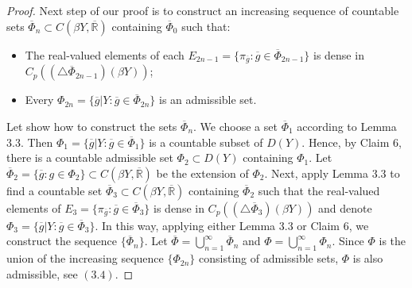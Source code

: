 \documentclass[12pt]{amsart}
\begin{document}
\begin{proof}
Next step of our proof is to construct an increasing sequence of countable sets $\overline\Phi_n\subset C(\beta Y,\overline{\mathbb R})$ containing $\overline\Phi_0$ such that:
\begin{itemize}
\item The real-valued elements of each $E_{2n-1}=\{\pi_{\overline g}: \overline g\in\overline\Phi_{2n-1}\}$ is dense in
$C_p((\triangle\overline\Phi_{2n-1})(\beta Y))$;
\item Every $\Phi_{2n}=\{\overline g|Y:\overline g\in\overline\Phi_{2n}\}$ is an admissible set.
\end{itemize}
Let show how to construct the sets $\overline\Phi_{n}$. We choose a set $\overline\Phi_{1}$ according to Lemma 3.3. Then 
$\Phi_{1}=\{\overline g|Y:\overline g\in\overline\Phi_{1}\}$ is a countable subset of $D(Y)$. Hence, by Claim 6, there is a countable admissible set
$\Phi_2\subset D(Y)$ containing $\Phi_{1}$. Let $\overline\Phi_2=\{\overline g:g\in\Phi_2\}\subset C(\beta Y,\overline{\mathbb R})$ be the extension of $\Phi_2$. Next, apply Lemma 3.3 to find a countable set $\overline\Phi_3\subset C(\beta Y,\overline{\mathbb R})$ containing $\overline\Phi_2$ such that
the real-valued elements of $E_{3}=\{\pi_{\overline g}: \overline g\in\overline\Phi_{3}\}$ is dense in
$C_p((\triangle\overline\Phi_{3})(\beta Y))$ and denote $\Phi_3=\{\overline g|Y:\overline g\in\overline\Phi_{3}\}$. In this way, applying either Lemma 3.3 or Claim 6, we construct the sequence $\{\overline\Phi_n\}$. Let $\overline\Phi=\bigcup_{n=1}^\infty\overline\Phi_n$ and $\Phi=\bigcup_{n=1}^\infty\Phi_n$. Since $\Phi$ is the union of the increasing sequence $\{\Phi_{2n}\}$ consisting of admissible sets, $\Phi$ is also admissible, see $(3.4)$. 


\end{proof}
\end{document}
